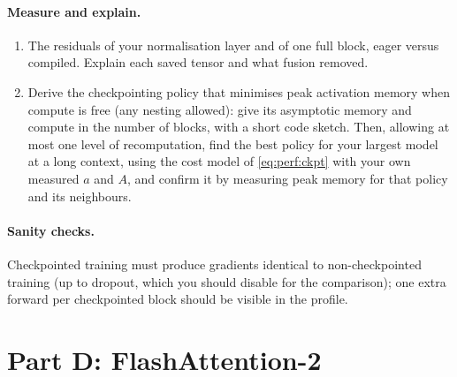\paragraph{Measure and explain.}
\begin{enumerate}
\item The residuals of your normalisation layer and of one full block, eager versus compiled. Explain
  each saved tensor and what fusion removed.
\item Derive the checkpointing policy that minimises peak activation memory when compute is free
  (any nesting allowed): give its asymptotic memory and compute in the number of blocks, with a short
  code sketch. Then, allowing at most one level of recomputation, find the best policy for your
  largest model at a long context, using the cost model of \cref{eq:perf:ckpt} with your own
  measured $a$ and $A$, and confirm it by measuring peak memory for that policy and its neighbours.
\end{enumerate}

\paragraph{Sanity checks.} Checkpointed training must produce gradients identical to
non-checkpointed training (up to dropout, which you should disable for the comparison); one extra
forward per checkpointed block should be visible in the profile.

\section{Part D: FlashAttention-2}\label{sec:proj2:d}

